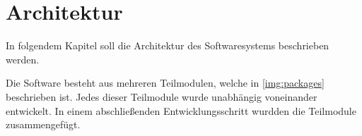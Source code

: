 \chapter{Architektur}

    In folgendem Kapitel soll die Architektur des Softwaresystems beschrieben
    werden.

    Die Software besteht aus mehreren Teilmodulen, welche in
    \autoref{img:packages} beschrieben ist.
    Jedes dieser Teilmodule wurde unabhängig voneinander entwickelt. In einem
    abschließenden Entwicklungsschritt wurdden die Teilmodule zusammengefügt.
